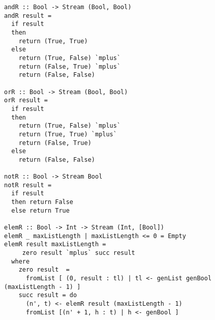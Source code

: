 \begin{figure*}[!t]
  \centering
  \begin{minipage}{\textwidth}
    \begin{lstlisting}[label={prop_helpers}, caption={Functions used in logic formulas generation}, captionpos=b, frame=tb]
andR :: Bool -> Stream (Bool, Bool)
andR result =
  if result
  then
    return (True, True)
  else
    return (True, False) `mplus`
    return (False, True) `mplus`
    return (False, False)

orR :: Bool -> Stream (Bool, Bool)
orR result =
  if result
  then
    return (True, False) `mplus`
    return (True, True) `mplus`
    return (False, True)
  else
    return (False, False)

notR :: Bool -> Stream Bool
notR result =
  if result
  then return False
  else return True

elemR :: Bool -> Int -> Stream (Int, [Bool])
elemR _ maxListLength | maxListLength <= 0 = Empty
elemR result maxListLength =
     zero result `mplus` succ result
  where
    zero result  =
      fromList [ (0, result : tl) | tl <- genList genBool (maxListLength - 1) ]
    succ result = do
      (n', t) <- elemR result (maxListLength - 1)
      fromList [(n' + 1, h : t) | h <- genBool ]
    \end{lstlisting}
  \end{minipage}
\end{figure*}


